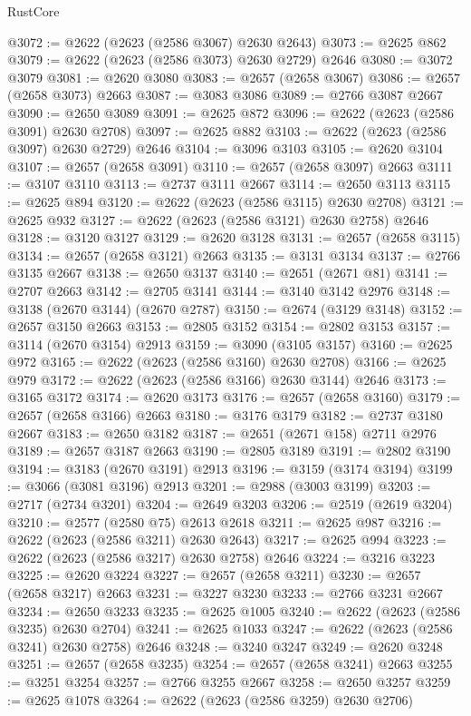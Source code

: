 \begin{lexlean}{RustCore}
\begin{coremodule}
@3072 := @2622 (@2623 (@2586 @3067) @2630 @2643)
@3073 := @2625 @862
@3079 := @2622 (@2623 (@2586 @3073) @2630 @2729) @2646
@3080 := @3072 @3079
@3081 := @2620 @3080
@3083 := @2657 (@2658 @3067)
@3086 := @2657 (@2658 @3073) @2663
@3087 := @3083 @3086
@3089 := @2766 @3087 @2667
@3090 := @2650 @3089
@3091 := @2625 @872
@3096 := @2622 (@2623 (@2586 @3091) @2630 @2708)
@3097 := @2625 @882
@3103 := @2622 (@2623 (@2586 @3097) @2630 @2729) @2646
@3104 := @3096 @3103
@3105 := @2620 @3104
@3107 := @2657 (@2658 @3091)
@3110 := @2657 (@2658 @3097) @2663
@3111 := @3107 @3110
@3113 := @2737 @3111 @2667
@3114 := @2650 @3113
@3115 := @2625 @894
@3120 := @2622 (@2623 (@2586 @3115) @2630 @2708)
@3121 := @2625 @932
@3127 := @2622 (@2623 (@2586 @3121) @2630 @2758) @2646
@3128 := @3120 @3127
@3129 := @2620 @3128
@3131 := @2657 (@2658 @3115)
@3134 := @2657 (@2658 @3121) @2663
@3135 := @3131 @3134
@3137 := @2766 @3135 @2667
@3138 := @2650 @3137
@3140 := @2651 (@2671 @81)
@3141 := @2707 @2663
@3142 := @2705 @3141
@3144 := @3140 @3142 @2976
@3148 := @3138 (@2670 @3144) (@2670 @2787)
@3150 := @2674 (@3129 @3148)
@3152 := @2657 @3150 @2663
@3153 := @2805 @3152
@3154 := @2802 @3153
@3157 := @3114 (@2670 @3154) @2913
@3159 := @3090 (@3105 @3157)
@3160 := @2625 @972
@3165 := @2622 (@2623 (@2586 @3160) @2630 @2708)
@3166 := @2625 @979
@3172 := @2622 (@2623 (@2586 @3166) @2630 @3144) @2646
@3173 := @3165 @3172
@3174 := @2620 @3173
@3176 := @2657 (@2658 @3160)
@3179 := @2657 (@2658 @3166) @2663
@3180 := @3176 @3179
@3182 := @2737 @3180 @2667
@3183 := @2650 @3182
@3187 := @2651 (@2671 @158) @2711 @2976
@3189 := @2657 @3187 @2663
@3190 := @2805 @3189
@3191 := @2802 @3190
@3194 := @3183 (@2670 @3191) @2913
@3196 := @3159 (@3174 @3194)
@3199 := @3066 (@3081 @3196) @2913
@3201 := @2988 (@3003 @3199)
@3203 := @2717 (@2734 @3201)
@3204 := @2649 @3203
@3206 := @2519 (@2619 @3204)
@3210 := @2577 (@2580 @75) @2613 @2618
@3211 := @2625 @987
@3216 := @2622 (@2623 (@2586 @3211) @2630 @2643)
@3217 := @2625 @994
@3223 := @2622 (@2623 (@2586 @3217) @2630 @2758) @2646
@3224 := @3216 @3223
@3225 := @2620 @3224
@3227 := @2657 (@2658 @3211)
@3230 := @2657 (@2658 @3217) @2663
@3231 := @3227 @3230
@3233 := @2766 @3231 @2667
@3234 := @2650 @3233
@3235 := @2625 @1005
@3240 := @2622 (@2623 (@2586 @3235) @2630 @2704)
@3241 := @2625 @1033
@3247 := @2622 (@2623 (@2586 @3241) @2630 @2758) @2646
@3248 := @3240 @3247
@3249 := @2620 @3248
@3251 := @2657 (@2658 @3235)
@3254 := @2657 (@2658 @3241) @2663
@3255 := @3251 @3254
@3257 := @2766 @3255 @2667
@3258 := @2650 @3257
@3259 := @2625 @1078
@3264 := @2622 (@2623 (@2586 @3259) @2630 @2706)

\end{coremodule}
\end{lexlean}
